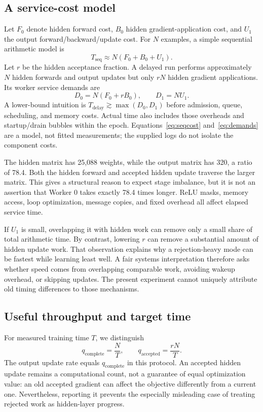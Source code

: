 \documentclass[conference]{IEEEtran}
\begin{document}
\subsection{A service-cost model}
Let $F_0$ denote hidden forward cost, $B_0$ hidden gradient-application cost, and $U_1$ the output forward/backward/update cost. For $N$ examples, a simple sequential arithmetic model is
\begin{equation}
 T_{\mathrm{seq}}\approx N(F_0+B_0+U_1).\label{eq:seqcost}
\end{equation}
Let $r$ be the hidden acceptance fraction. A delayed run performs approximately $N$ hidden forwards and output updates but only $rN$ hidden gradient applications. Its worker service demands are
\begin{equation}
 D_0=N(F_0+rB_0),\qquad D_1=NU_1.\label{eq:demands}
\end{equation}
A lower-bound intuition is $T_{\mathrm{delay}}\gtrsim\max(D_0,D_1)$ before admission, queue, scheduling, and memory costs. Actual time also includes those overheads and startup/drain bubbles within the epoch. Equations~\ref{eq:seqcost} and~\ref{eq:demands} are a model, not fitted measurements; the supplied logs do not isolate the component costs.

The hidden matrix has 25,088 weights, while the output matrix has 320, a ratio of 78.4. Both the hidden forward and accepted hidden update traverse the larger matrix. This gives a structural reason to expect stage imbalance, but it is not an assertion that Worker 0 takes exactly 78.4 times longer. ReLU masks, memory access, loop optimization, message copies, and fixed overhead all affect elapsed service time.

If $U_1$ is small, overlapping it with hidden work can remove only a small share of total arithmetic time. By contrast, lowering $r$ can remove a substantial amount of hidden update work. That observation explains why a rejection-heavy mode can be fastest while learning least well. A fair systems interpretation therefore asks whether speed comes from overlapping comparable work, avoiding wakeup overhead, or skipping updates. The present experiment cannot uniquely attribute old timing differences to those mechanisms.

\subsection{Useful throughput and target time}
For measured training time $T$, we distinguish
\begin{equation}
 q_{\mathrm{complete}}=\frac{N}{T},\qquad
 q_{\mathrm{accepted}}=\frac{rN}{T}.\label{eq:rates}
\end{equation}
The output update rate equals $q_{\mathrm{complete}}$ in this protocol. An accepted hidden update remains a computational count, not a guarantee of equal optimization value: an old accepted gradient can affect the objective differently from a current one. Nevertheless, reporting it prevents the especially misleading case of treating rejected work as hidden-layer progress.
\end{document}
